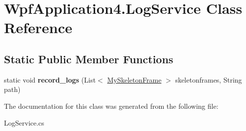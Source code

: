 \hypertarget{class_wpf_application4_1_1_log_service}{\section{Wpf\-Application4.\-Log\-Service Class Reference}
\label{class_wpf_application4_1_1_log_service}
}
\subsection*{Static Public Member Functions}
\begin{DoxyCompactItemize}
\item 
\hypertarget{class_wpf_application4_1_1_log_service_a5d70bd5633100776da11693026b2816f}{static void {\bfseries record\-\_\-logs} (List$<$ \hyperlink{class_wpf_application4_1_1_my_skeleton_frame}{My\-Skeleton\-Frame} $>$ skeletonframes, String path)}\label{class_wpf_application4_1_1_log_service_a5d70bd5633100776da11693026b2816f}

\end{DoxyCompactItemize}


The documentation for this class was generated from the following file\-:\begin{DoxyCompactItemize}
\item 
Log\-Service.\-cs\end{DoxyCompactItemize}
